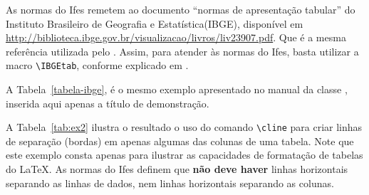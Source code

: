 \documentclass[12pt,times,a4paper,english,brazil,
chapter=TITLE,section=TITLE,subsection=TITLE]{ifes7}
\begin{document}
As normas do Ifes remetem ao documento ``normas de apresentação
tabular'' do Instituto Brasileiro de Geografia e Estatística(IBGE),
disponível em
\url{http://biblioteca.ibge.gov.br/visualizacao/livros/liv23907.pdf}.
Que é a mesma referência utilizada pelo \abnTeX. Assim, para atender
às normas do Ifes, basta utilizar a macro \verb!\IBGEtab!, conforme
explicado em \cite[p.~41]{Araujo2016}.

\begin{table}[h!]
\end{table}

A Tabela~\ref{tabela-ibge}, é o mesmo exemplo apresentado no manual da
classe \abnTeX, inserida aqui apenas a título de demonstração.


\begin{table}[htb]
\end{table}

A Tabela~\ref{tab:ex2} ilustra o resultado o uso do comando
\verb!\cline! para criar linhas de separação (bordas) em apenas
algumas das colunas de uma tabela. Note que este exemplo consta apenas
para ilustrar as capacidades de formatação de tabelas do \LaTeX. As
normas do Ifes definem que \textbf{não deve haver} linhas horizontais
separando as linhas de dados, nem linhas horizontais separando as
colunas.
\end{document}
